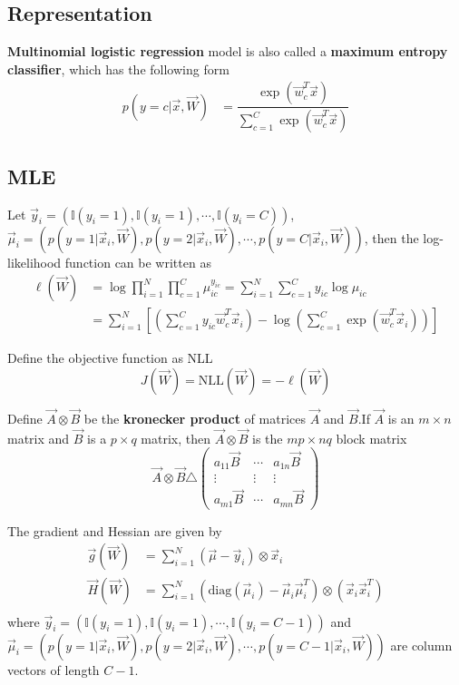 \subsection{Representation}
\textbf{Multinomial logistic regression} model is also called a \textbf{maximum entropy classifier}, which has the following form
\begin{align}
p(y=c|\vec{x},\vec{W}) & =\dfrac{\exp(\vec{w}_c^T\vec{x})}{\sum_{c=1}^C \exp(\vec{w}_c^T\vec{x})}
\end{align}


\subsection{MLE}
Let $\vec{y}_i=(\mathbb{I}(y_i=1),\mathbb{I}(y_i=1),\cdots, \mathbb{I}(y_i=C))$, $\vec{\mu}_i=(p(y=1|\vec{x}_i,\vec{W}),p(y=2|\vec{x}_i,\vec{W}),\cdots, p(y=C|\vec{x}_i,\vec{W}))$, then the log-likelihood function can be written as
\begin{align}
\ell(\vec{W}) & =\log\prod\limits_{i=1}^N\prod\limits_{c=1}^C \mu_{ic}^{y_{ic}}=\sum\limits_{i=1}^N\sum\limits_{c=1}^C y_{ic}\log \mu_{ic} \\
     & = \sum\limits_{i=1}^N\left[\left(\sum\limits_{c=1}^C y_{ic}\vec{w}_c^T\vec{x}_i\right)-\log\left(\sum\limits_{c=1}^C \exp(\vec{w}_c^T\vec{x}_i)\right)\right]
\end{align}

Define the objective function as NLL
\begin{equation}
J(\vec{W})=\mathrm{NLL}(\vec{W})=-\ell(\vec{W})
\end{equation}

Define $\vec{A} \otimes \vec{B}$ be the \textbf{kronecker product} of matrices $\vec{A}$ and $\vec{B}$.If $\vec{A}$ is an $m \times n$ matrix and $\vec{B}$ is a $p \times q$ matrix, then $\vec{A} \otimes \vec{B}$ is the $mp \times nq$ block matrix
\begin{equation}
\vec{A} \otimes \vec{B} \triangle \left(\begin{array}{ccc}
a_{11}\vec{B} & \cdots & a_{1n}\vec{B} \\
\vdots & \vdots & \vdots \\
a_{m1}\vec{B} & \cdots & a_{mn}\vec{B}
\end{array}\right)
\end{equation}

The gradient and Hessian are given by
\begin{align}
\vec{g}(\vec{W}) & =\sum\limits_{i=1}^N (\vec{\mu}-\vec{y}_i) \otimes \vec{x}_i \\
\vec{H}(\vec{W}) & =\sum\limits_{i=1}^N (\mathrm{diag}(\vec{\mu}_i)-\vec{\mu}_i\vec{\mu}_i^T) \otimes (\vec{x}_i\vec{x}_i^T) \\
\end{align}
where $\vec{y}_i=(\mathbb{I}(y_i=1),\mathbb{I}(y_i=1),\cdots, \mathbb{I}(y_i=C-1))$ and $\vec{\mu}_i=(p(y=1|\vec{x}_i,\vec{W}),p(y=2|\vec{x}_i,\vec{W}),\cdots, p(y=C-1|\vec{x}_i,\vec{W}))$ are column vectors of length $C-1$.

